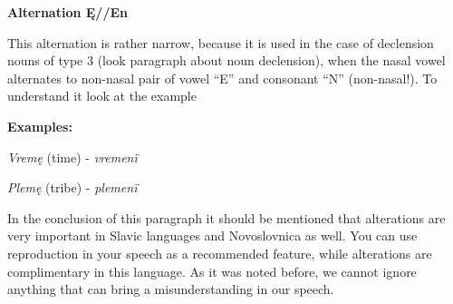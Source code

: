 




\textbf{Alternation Ę//En}

This alternation is rather narrow, because it is used in the case of declension nouns of type 3 (look paragraph about noun declension), when the nasal vowel \textipa{[\~E]} alternates to non-nasal pair of vowel “E” and consonant “N” (non-nasal!). To understand it look at the example

\textbf{Examples:}

\textit{Vremę} (time) \textipa{[‘vrEmj\~E]} - \textit{vremenï} 

\textit{Plemę} (tribe) \textipa{[‘plEmj\~E]} - \textit{plemenï} 

In the conclusion of this paragraph it should be mentioned that alterations are very important in Slavic languages and Novoslovnica as well. You can use reproduction in your speech as a recommended feature, while alterations are complimentary in this language. As it was noted before, we cannot ignore anything that can bring a misunderstanding in our speech. 
